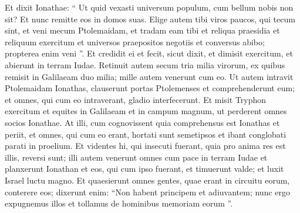 \begin{biblechapter}
\begin{biblechapter}
\begin{biblechapter}
\begin{biblechapter}
\begin{biblechapter}
\begin{biblechapter}
\begin{biblechapter}
\begin{biblechapter}
\begin{biblechapter}
\begin{biblechapter}
\begin{biblechapter}
\begin{biblechapter}
\verse Et dixit Ionathae: “ Ut quid vexasti universum populum, cum bellum nobis non sit? 
 \verse Et nunc remitte eos in domos suas. Elige autem tibi viros paucos, qui tecum sint, et veni mecum Ptolemaidam, et tradam eam tibi et reliqua praesidia et reliquum exercitum et universos praepositos negotiis et conversus abibo; propterea enim veni ”. 
\verse Et credidit ei et fecit, sicut dixit, et dimisit exercitum, et abierunt in terram Iudae. 
\verse Retinuit autem secum tria milia virorum, ex quibus remisit in Galilaeam duo milia; mille autem venerunt cum eo. 
 \verse Ut autem intravit Ptolemaidam Ionathas, clauserunt portas Ptolemenses et comprehenderunt eum; et omnes, qui cum eo intraverant, gladio interfecerunt. 
 \verse Et misit Tryphon exercitum et equites in Galilaeam et in campum magnum, ut perderent omnes socios Ionathae. 
\verse At illi, cum cognovissent quia comprehensus est Ionathas et periit, et omnes, qui cum eo erant, hortati sunt semetipsos et ibant conglobati parati in proelium. 
\verse Et videntes hi, qui insecuti fuerant, quia pro anima res est illis, reversi sunt; 
\verse illi autem venerunt omnes cum pace in terram Iudae et planxerunt Ionathan et eos, qui cum ipso fuerant, et timuerunt valde; et luxit Israel luctu magno. 
\verse Et quaesierunt omnes gentes, quae erant in circuitu eorum, conterere eos; dixerunt enim: 
\verse “Non habent principem et adiuvantem; nunc ergo expugnemus illos et tollamus de hominibus memoriam eorum ”.
 

\end{biblechapter}
\end{biblechapter}
\end{biblechapter}
\end{biblechapter}
\end{biblechapter}
\end{biblechapter}
\end{biblechapter}
\end{biblechapter}
\end{biblechapter}
\end{biblechapter}
\end{biblechapter}
\end{biblechapter}
